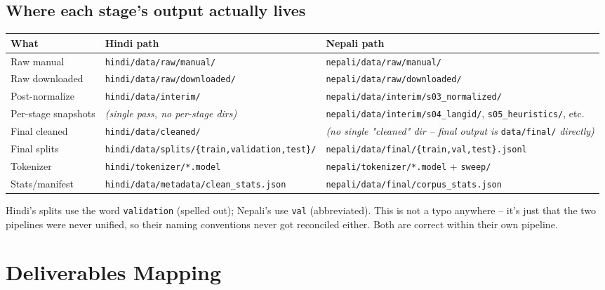 \documentclass[11pt]{report}
\begin{document}
\section{Where each stage's output actually lives}

\begin{center}
\begin{tabular}{lll}
\toprule
What & Hindi path & Nepali path \\
\midrule
Raw manual & \texttt{hindi/data/raw/manual/} & \texttt{nepali/data/raw/manual/} \\
Raw downloaded & \texttt{hindi/data/raw/downloaded/} & \texttt{nepali/data/raw/downloaded/} \\
Post-normalize & \texttt{hindi/data/interim/} & \texttt{nepali/data/interim/s03\_normalized/} \\
Per-stage snapshots & \textit{(single pass, no per-stage dirs)} &
\texttt{nepali/data/interim/s04\_langid/}, \texttt{s05\_heuristics/}, etc. \\
Final cleaned & \texttt{hindi/data/cleaned/} & \textit{(no single "cleaned" dir --
final output is} \texttt{data/final/} \textit{directly)} \\
Final splits & \texttt{hindi/data/splits/\{train,validation,test\}/} &
\texttt{nepali/data/final/\{train,val,test\}.jsonl} \\
Tokenizer & \texttt{hindi/tokenizer/*.model} & \texttt{nepali/tokenizer/*.model} +
\texttt{sweep/} \\
Stats/manifest & \texttt{hindi/data/metadata/clean\_stats.json} &
\texttt{nepali/data/final/corpus\_stats.json} \\
\bottomrule
\end{tabular}
\end{center}

\begin{warnbox}
Hindi's splits use the word \texttt{validation} (spelled out); Nepali's
use \texttt{val} (abbreviated). This is not a typo anywhere -- it's just
that the two pipelines were never unified, so their naming conventions
never got reconciled either. Both are correct within their own pipeline.
\end{warnbox}

\chapter{Deliverables Mapping}
\end{document}
